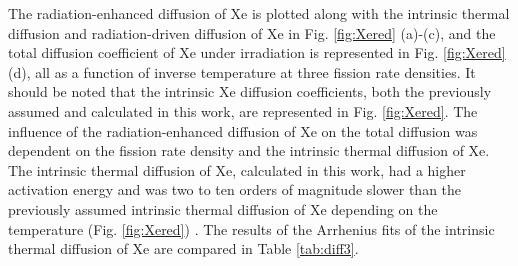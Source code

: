 \documentclass[preprint,12pt]{elsarticle}
\begin{document}
\FloatBarrier


\indent The radiation-enhanced diffusion of Xe is plotted along with the intrinsic thermal diffusion and radiation-driven diffusion of Xe in Fig. \ref{fig:Xered} (a)-(c), and the total diffusion coefficient of Xe under irradiation is represented in Fig. \ref{fig:Xered}(d), all as a function of inverse temperature at three fission rate densities. It should be noted that the intrinsic Xe diffusion coefficients, both the previously assumed \cite{hu2016microstructural, Beeler2018microstructural} and calculated in this work, are represented in Fig. \ref{fig:Xered}. The influence of the radiation-enhanced diffusion of Xe on the total diffusion was dependent on the fission rate density and the intrinsic thermal diffusion of Xe. The intrinsic thermal diffusion of Xe, calculated in this work, had a higher activation energy and was two to ten orders of magnitude slower than the previously assumed intrinsic thermal diffusion of Xe depending on the temperature (Fig. \ref{fig:Xered}) \cite{hu2016microstructural, Beeler2018microstructural}. The results of the Arrhenius fits of the intrinsic thermal diffusion of Xe are compared in Table \ref{tab:diff3}. 
\end{document}
